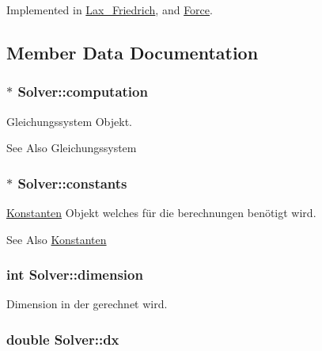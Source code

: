Implemented in \hyperlink{classLax__Friedrich_a77ace0aa368e5b04263b23a69d2b3fe7}{Lax\-\_\-\-Friedrich}, and \hyperlink{classForce_a6c395b2d375796332c6d688760c79dc4}{Force}.



\subsection{Member Data Documentation}
\hypertarget{classSolver_a158efd10f04099b8be28561f990b646a}{
\subsubsection[{computation}]{$\ast$ Solver\-::computation}}\label{classSolver_a158efd10f04099b8be28561f990b646a}
Gleichungssystem Objekt. \begin{DoxySeeAlso}{See Also}
Gleichungssystem 
\end{DoxySeeAlso}
\hypertarget{classSolver_af8791d3a5042e7be5980ae3247cb60de}{
\subsubsection[{constants}]{$\ast$ Solver\-::constants}}\label{classSolver_af8791d3a5042e7be5980ae3247cb60de}
\hyperlink{classKonstanten}{Konstanten} Objekt welches für die berechnungen benötigt wird. \begin{DoxySeeAlso}{See Also}
\hyperlink{classKonstanten}{Konstanten} 
\end{DoxySeeAlso}
\hypertarget{classSolver_a9f81101cc1872e3da6b2f20fb678fa02}{
\subsubsection[{dimension}]{\setlength{\rightskip}{0pt plus 5cm}int Solver\-::dimension}}\label{classSolver_a9f81101cc1872e3da6b2f20fb678fa02}
Dimension in der gerechnet wird. \hypertarget{classSolver_a52a573400ef79611f2b7cf28e0a101ac}{
\subsubsection[{dx}]{\setlength{\rightskip}{0pt plus 5cm}double Solver\-::dx}}\label{classSolver_a52a573400ef79611f2b7cf28e0a101ac}
